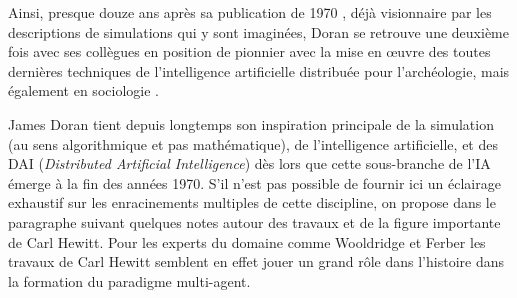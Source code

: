 Ainsi, presque douze ans après sa publication de 1970 \autocite{Doran1970}, déjà visionnaire par les descriptions de simulations qui y sont imaginées, Doran se retrouve une deuxième fois avec ses collègues en position de pionnier avec la mise en œuvre des toutes dernières techniques de l'intelligence artificielle distribuée pour l'archéologie, mais également en sociologie \autocite{Doran1985}. 

James Doran tient depuis longtemps son inspiration principale de la simulation (au sens algorithmique et pas mathématique), de l'intelligence artificielle, et des DAI (\textit{Distributed Artificial Intelligence}) dès lors que cette sous-branche de l'IA émerge à la fin des années 1970. S'il n'est pas possible de fournir ici un éclairage exhaustif sur les enracinements multiples de cette discipline, on propose dans le paragraphe suivant quelques notes autour des travaux et de la figure importante de Carl Hewitt. Pour les experts du domaine comme Wooldridge et Ferber les travaux de Carl Hewitt semblent en effet jouer un grand rôle dans l'histoire dans la formation du paradigme multi-agent.






